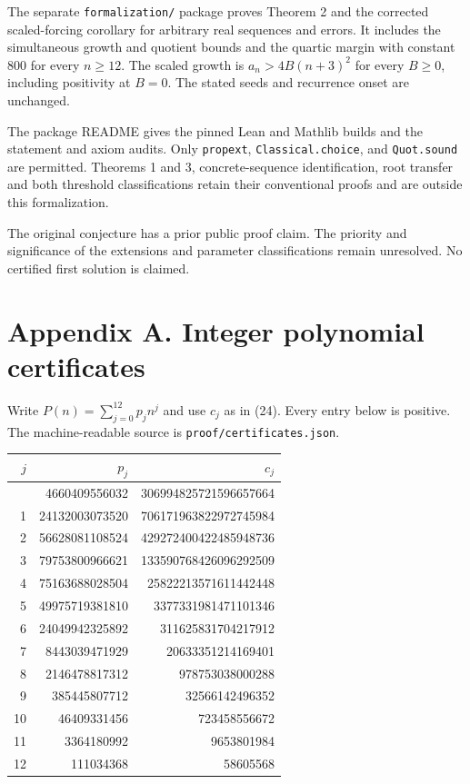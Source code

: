 \documentclass[
  11pt,
  a4paper,
]{article}
\begin{document}
The separate \texttt{formalization/} package proves Theorem 2 and the
corrected scaled-forcing corollary for arbitrary real sequences and
errors. It includes the simultaneous growth and quotient bounds and the
quartic margin with constant 800 for every \(n\ge12\). The scaled growth
is \(a_n>4B(n+3)^2\) for every \(B\ge0\), including positivity at
\(B=0\). The stated seeds and recurrence onset are unchanged.

The package README gives the pinned Lean and Mathlib builds and the
statement and axiom audits. Only \texttt{propext},
\texttt{Classical.choice}, and \texttt{Quot.sound} are permitted. Theorems 1 and 3,
concrete-sequence identification, root transfer and both threshold
classifications retain their conventional proofs and are outside this
formalization.

The original conjecture has a prior public proof claim. The priority and
significance of the extensions and parameter classifications remain
unresolved. No certified first solution is claimed.


\section{Appendix A. Integer polynomial
certificates}\label{appendix-a.-integer-polynomial-certificates}

Write \(P(n)=\sum_{j=0}^{12}p_jn^j\) and use \(c_j\) as in (24). Every
entry below is positive. The machine-readable source is
\texttt{proof/certificates.json}.

\begin{longtable}[]{@{}rrr@{}}
\toprule\noalign{}
\(j\) & \(p_j\) & \(c_j\) \\
\midrule\noalign{}
\endhead
\bottomrule\noalign{}
\endlastfoot
0 & 4660409556032 & 306994825721596657664 \\
1 & 24132003073520 & 706171963822972745984 \\
2 & 56628081108524 & 429272400422485948736 \\
3 & 79753800966621 & 133590768426096292509 \\
4 & 75163688028504 & 25822213571611442448 \\
5 & 49975719381810 & 3377331981471101346 \\
6 & 24049942325892 & 311625831704217912 \\
7 & 8443039471929 & 20633351214169401 \\
8 & 2146478817312 & 978753038000288 \\
9 & 385445807712 & 32566142496352 \\
10 & 46409331456 & 723458556672 \\
11 & 3364180992 & 9653801984 \\
12 & 111034368 & 58605568 \\
\end{longtable}
\end{document}
